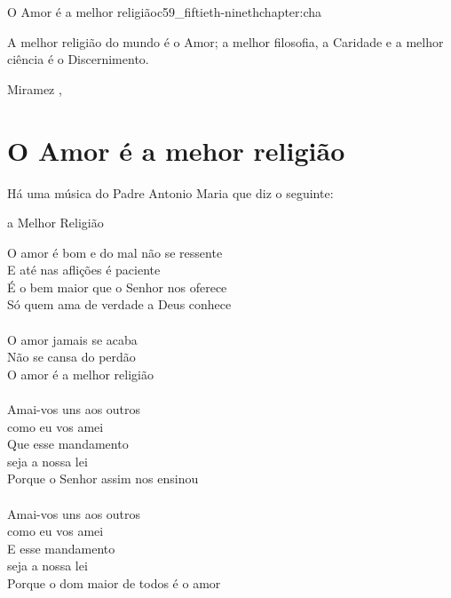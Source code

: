 \begin{chapterpage}{O Amor é a melhor religião}{c59_fiftieth-ninethchapter:cha}
 
\begin{myquotation}A melhor religião do mundo é o Amor; a melhor filosofia, a Caridade e a melhor ciência é o Discernimento.
\par\vspace*{15mm}
\mbox{}\hfill \emdash{}Miramez
, %
\par\end{myquotation}

\end{chapterpage}



\section{O Amor é a mehor religião}\label{c1_basicformatting:sec}

\emdash{}Há uma música do Padre Antonio Maria que diz o seguinte:

a Melhor Religião

O amor é bom e do mal não se ressente \\
E até nas aflições é paciente \\
É o bem maior que o Senhor nos oferece \\
Só quem ama de verdade a Deus conhece \\
 \\
O amor jamais se acaba \\
Não se cansa do perdão \\
O amor é a melhor religião \\
 \\
Amai-vos uns aos outros \\
como eu vos amei \\
Que esse mandamento \\
seja a nossa lei \\
Porque o Senhor assim nos ensinou \\
 \\
Amai-vos uns aos outros \\
como eu vos amei \\
E esse mandamento \\
seja a nossa lei \\
Porque o dom maior de todos é o amor \\

